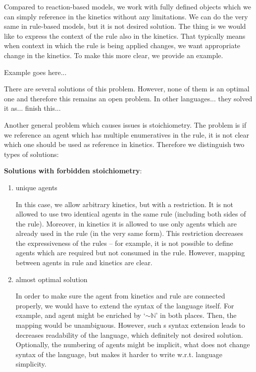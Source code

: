 \documentclass[12pt]{fithesis2}
\begin{document}
Compared to reaction-based models, we work with fully defined objects which we can simply reference in the kinetics without any limitations. We can do the very same in rule-based models, but it is not desired solution. The thing is we would like to express the context of the rule also in the kinetics. That typically means when context in which the rule is being applied changes, we want appropriate change in the kinetics. To make this more clear, we provide an example.

Example goes here...

There are several solutions of this problem. However, none of them is an optimal one and therefore this remains an open problem. In other languages... they solved it as... finish this...

Another general problem which causes issues is stoichiometry. The problem is if we reference an agent which has multiple enumeratives in the rule, it is not clear which one should be used as reference in kinetics. Therefore we distinguish two types of solutions:

\textbf{Solutions with forbidden stoichiometry}:

\begin{enumerate}
\item unique agents

In this case, we allow arbitrary kinetics, but with a restriction. It is not allowed to use two identical agents in the same rule (including both sides of the rule). Moreover, in kinetics it is allowed to use only agents which are already used in the rule (in the very same form). This restriction decreases the expressiveness of the rules -- for example, it is not possible to define agents which are required but not consumed in the rule. However, mapping between agents in rule and kinetics are clear.

\item almost optimal solution

In order to make sure the agent from kinetics and rule are connected properly, we would have to extend the syntax of the language itself. For example, and agent might be enriched by `$\sim\mathbb{N}$' in both places. Then, the mapping would be unambiguous. However, such s syntax extension leads to decreases readability of the language, which definitely not desired solution. Optionally, the numbering of agents might be implicit, what does not change syntax of the language, but makes it harder to write w.r.t. language simplicity.

\end{enumerate}
\end{document}
